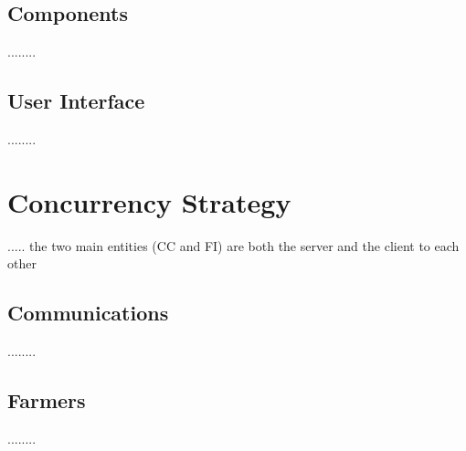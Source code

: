 \documentclass[12pt]{article}
\begin{document}
\subsection{Components} %

........

\subsection{User Interface} %

........

\newpage
\section{Concurrency Strategy} %

..... the two main entities (CC and FI) are both the server and the client to each other

\subsection{Communications} %

........

\subsection{Farmers} %

........



\end{document}
